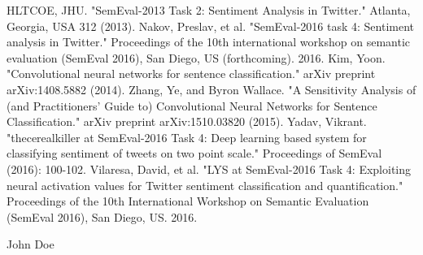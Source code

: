 \documentclass[conference]{IEEEtran}
\begin{document}
%
%
%
\begin{thebibliography}{2}

HLTCOE, JHU. "SemEval-2013 Task 2: Sentiment Analysis in Twitter." Atlanta, Georgia, USA 312 (2013).
Nakov, Preslav, et al. "SemEval-2016 task 4: Sentiment analysis in Twitter." Proceedings of the 10th international workshop on semantic evaluation (SemEval 2016), San Diego, US (forthcoming). 2016.
Kim, Yoon. "Convolutional neural networks for sentence classification." arXiv preprint arXiv:1408.5882 (2014).
Zhang, Ye, and Byron Wallace. "A Sensitivity Analysis of (and Practitioners' Guide to) Convolutional Neural Networks for Sentence Classification." arXiv preprint arXiv:1510.03820 (2015).
Yadav, Vikrant. "thecerealkiller at SemEval-2016 Task 4: Deep learning based system for classifying sentiment of tweets on two point scale." Proceedings of SemEval (2016): 100-102.
Vilaresa, David, et al. "LYS at SemEval-2016 Task 4: Exploiting neural activation values for Twitter sentiment classification and quantification." Proceedings of the 10th International Workshop on Semantic Evaluation (SemEval 2016), San Diego, US. 2016.

\end{thebibliography}

% 

\begin{IEEEbiography}{John Doe}
\blindtext
\end{IEEEbiography}







\end{document}
